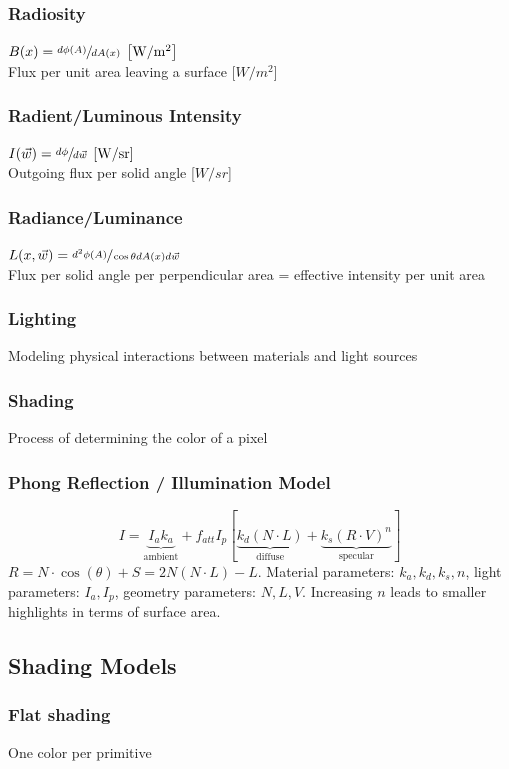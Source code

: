 \documentclass[a4paper,10pt]{article}
\begin{document}
\subsubsection{Radiosity} \( B(x) = \sfrac{d \phi (A)}{dA(x)} \; \left[\unit{W/m^2}\right] \) \\
Flux per unit area leaving a surface [\( \unit{W/m^2} \)]
\subsubsection{Radient/Luminous Intensity} \( I(\vec{w}) = \sfrac{d \phi}{d \vec{w}} \; \left[\unit{W/sr}\right] \) \\
Outgoing flux per solid angle [\( \unit{W/sr} \)]
\subsubsection{Radiance/Luminance} \( L(x, \vec{w}) = \sfrac{d^2 \phi (A)}{\cos \theta d A(x) d \vec{w}} \) \\
Flux per solid angle per perpendicular area = effective intensity per unit area

\subsubsection{Lighting} Modeling physical interactions between materials and light sources
\subsubsection{Shading} Process of determining the color of a pixel
\subsubsection{Phong Reflection / Illumination Model} 
\[
    I = \underbrace{I_a k_a}_{\text{ambient}} + f_{att} I_p [\underbrace{k_d(N\cdot L)}_{\text{diffuse}} + \underbrace{k_s(R\cdot V)^n}_{\text{specular}}]
\] 
\( R = N \cdot \cos (\theta) + S = 2N(N\cdot L) - L \).
Material parameters: \( k_a, k_d, k_s, n \),
light parameters: \( I_a, I_p \),
geometry parameters: \( N, L, V \). Increasing \( n \) leads to smaller highlights in terms of surface area. 

\subsection{Shading Models}
\subsubsection{Flat shading} One color per primitive
\end{document}
